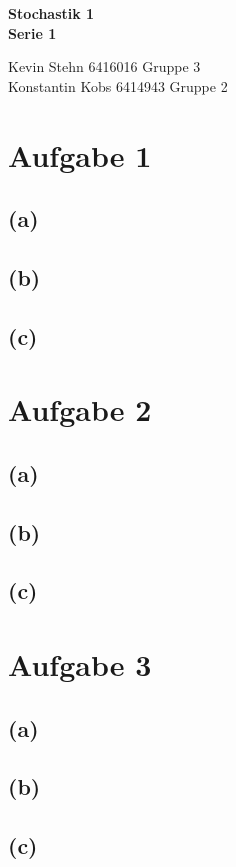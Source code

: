 \documentclass[10pt,a4paper]{article}
\begin{document}
\begin{center}
\textbf{Stochastik 1 \\ Serie 1 \\}
\end{center}

\begin{flushright}
Kevin Stehn 6416016 Gruppe 3 \\
Konstantin Kobs 6414943 Gruppe 2
\end{flushright}

\section*{Aufgabe 1}
\subsection*{(a)}
\subsection*{(b)}
\subsection*{(c)}

\section*{Aufgabe 2}
\subsection*{(a)}
\subsection*{(b)}
\subsection*{(c)}

\section*{Aufgabe 3}
\subsection*{(a)}
\subsection*{(b)}
\subsection*{(c)}
\end{document}
